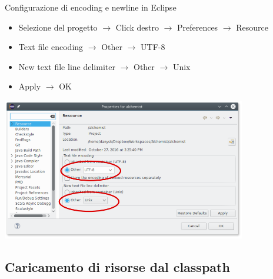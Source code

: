 \documentclass[presentation]{beamer}
\begin{document}
\begin{frame}{Configurazione di encoding e newline in Eclipse}
	\begin{itemize}
		\item Selezione del progetto $\rightarrow$ Click destro $\rightarrow$ Preferences $\rightarrow$ Resource
		\item Text file encoding $\rightarrow$ Other $\rightarrow$ UTF-8
		\item New text file line delimiter $\rightarrow$ Other $\rightarrow$ Unix
		\item Apply $\rightarrow$ OK
	\end{itemize}
	\begin{center}
	\includegraphics[width=0.8\textwidth]{img/eclipse-encoding}
	\end{center}
\end{frame}

\subsection{Caricamento di risorse dal classpath}
\end{document}
